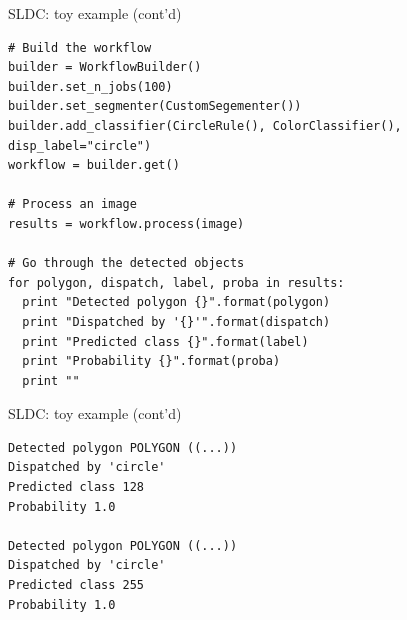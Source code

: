\documentclass{beamer}
\begin{document}
\begin{frame}[fragile]{SLDC: toy example (cont'd)}
\begin{verbatim}
# Build the workflow
builder = WorkflowBuilder()
builder.set_n_jobs(100)
builder.set_segmenter(CustomSegementer())
builder.add_classifier(CircleRule(), ColorClassifier(), disp_label="circle")
workflow = builder.get()

# Process an image
results = workflow.process(image)

# Go through the detected objects
for polygon, dispatch, label, proba in results:
  print "Detected polygon {}".format(polygon)
  print "Dispatched by '{}'".format(dispatch)
  print "Predicted class {}".format(label)
  print "Probability {}".format(proba)
  print ""
\end{verbatim}
\end{frame}

\begin{frame}[fragile]{SLDC: toy example (cont'd)}
\begin{verbatim}
Detected polygon POLYGON ((...))
Dispatched by 'circle'
Predicted class 128
Probability 1.0

Detected polygon POLYGON ((...))
Dispatched by 'circle'
Predicted class 255
Probability 1.0
\end{verbatim}
\end{frame}
\end{document}
